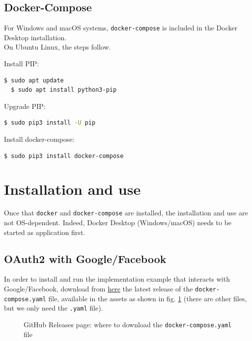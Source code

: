 \newpage

\subsection{Docker-Compose}
For Windows and macOS systems, \texttt{docker-compose} is included in the Docker Desktop installation.\\
On Ubuntu Linux, the steps follow.

\noindent Install PIP:
\begin{lstlisting}[language=bash]
  $ sudo apt update
  $ sudo apt install python3-pip
\end{lstlisting}

\noindent Upgrade PIP:
\begin{lstlisting}[language=bash]
  $ sudo pip3 install -U pip
\end{lstlisting}

\noindent Install docker-compose:
\begin{lstlisting}[language=bash]
  $ sudo pip3 install docker-compose
\end{lstlisting}

\section{Installation and use}
Once that \texttt{docker} and \texttt{docker-compose} are installed, the installation and use are not OS-dependent. Indeed, Docker Desktop (Windows/macOS) needs to be started as application first.

\subsection{OAuth2 with Google/Facebook}
In order to install and run the implementation example that interacts with Google/Facebook, download from \href{https://github.com/nopesir/oauth-hw-security/releases}{here} the latest release of the \texttt{docker-compose.yaml} file, available in the assets as shown in fig. \ref{fig:rel1} (there are other files, but we only need the \texttt{.yaml} file).

\begin{figure}[h!]
    \centering
    \caption{GitHub Releases page: where to download the \texttt{docker-compose.yaml} file}
    \label{fig:rel1}
\end{figure}

